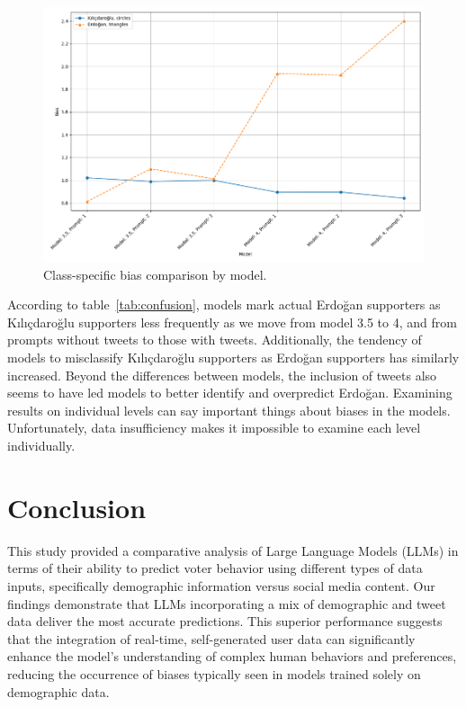 \documentclass[sigconf,natbib=false]{acmart}
\begin{document}
\begin{figure}[ht]
  \centering
  \includegraphics[width=\linewidth]{graph3.png}
  \caption{Class-specific bias comparison by model.}
\end{figure}

According to table~\ref{tab:confusion}, models mark actual Erdoğan supporters as Kılıçdaroğlu supporters less frequently as we move from model 3.5 to 4, and from prompts without tweets to those with tweets. Additionally, the tendency of models to misclassify Kılıçdaroğlu supporters as Erdoğan supporters has similarly increased. Beyond the differences between models, the inclusion of tweets also seems to have led models to better identify and overpredict Erdoğan. Examining results on individual levels can say important things about biases in the models. Unfortunately, data insufficiency makes it impossible to examine each level individually.

\section{Conclusion}
This study provided a comparative analysis of Large Language Models (LLMs) in terms of their ability to predict voter behavior using different types of data inputs, specifically demographic information versus social media content. Our findings demonstrate that LLMs incorporating a mix of demographic and tweet data deliver the most accurate predictions. This superior performance suggests that the integration of real-time, self-generated user data can significantly enhance the model's understanding of complex human behaviors and preferences, reducing the occurrence of biases typically seen in models trained solely on demographic data.
\end{document}
